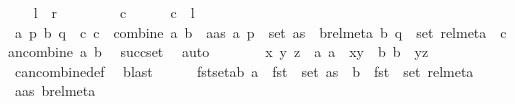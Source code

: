 \begin{isabellebody}
%
\isadelimproof
%
\endisadelimproof
%
\isatagproof
{}\isamarkupfalse%
\isanewline
\ \ \isamarkupfalse%
\ {\isachardoublequoteopen}{\isacharquery}{\kern0pt}l\ {\isasymsubseteq}\ {\isacharquery}{\kern0pt}r{\isachardoublequoteclose}\isanewline
\ \ \isamarkupfalse%
\isanewline
\ \ \ \ \isamarkupfalse%
\ c\isanewline
\ \ \ \ \isamarkupfalse%
\ {\isachardoublequoteopen}c\ {\isasymin}\ {\isacharquery}{\kern0pt}l{\isachardoublequoteclose}\isanewline
\ \ \ \ \isamarkupfalse%
\ \isamarkupfalse%
\ a\ p\ b\ q\ \ c{\isacharcolon}{\kern0pt}\ {\isachardoublequoteopen}c\ {\isacharequal}{\kern0pt}\ combine\ a\ b{\isachardoublequoteclose}\ \ a{\isacharunderscore}{\kern0pt}as{\isacharcolon}{\kern0pt}\ {\isachardoublequoteopen}{\isacharparenleft}{\kern0pt}a{\isacharcomma}{\kern0pt}\ p{\isacharparenright}{\kern0pt}\ {\isasymin}\ set\ as{\isachardoublequoteclose}\ \ b{\isacharunderscore}{\kern0pt}rel{\isacharunderscore}{\kern0pt}meta{\isacharcolon}{\kern0pt}\ {\isachardoublequoteopen}{\isacharparenleft}{\kern0pt}b{\isacharcomma}{\kern0pt}\ q{\isacharparenright}{\kern0pt}\ {\isasymin}\ set\ rel{\isacharunderscore}{\kern0pt}meta\ {\isasymand}\ can{\isacharunderscore}{\kern0pt}combine\ a\ b{\isachardoublequoteclose}\ \isamarkupfalse%
\ succ{\isacharunderscore}{\kern0pt}set\ \isamarkupfalse%
\ auto\isanewline
\ \ \ \ \isamarkupfalse%
\ \isamarkupfalse%
\ x\ y\ z\ \ a{\isacharcolon}{\kern0pt}\ {\isachardoublequoteopen}a\ {\isacharequal}{\kern0pt}\ {\isacharparenleft}{\kern0pt}x{\isacharcomma}{\kern0pt}y{\isacharparenright}{\kern0pt}{\isachardoublequoteclose}\ \ b{\isacharcolon}{\kern0pt}\ {\isachardoublequoteopen}b\ {\isacharequal}{\kern0pt}\ {\isacharparenleft}{\kern0pt}y{\isacharcomma}{\kern0pt}z{\isacharparenright}{\kern0pt}{\isachardoublequoteclose}\ \isamarkupfalse%
\ can{\isacharunderscore}{\kern0pt}combine{\isacharunderscore}{\kern0pt}def\ \isamarkupfalse%
\ blast\isanewline
\ \ \ \ \isamarkupfalse%
\ fst{\isacharunderscore}{\kern0pt}set{\isacharunderscore}{\kern0pt}ab{\isacharcolon}{\kern0pt}\ {\isachardoublequoteopen}a\ {\isasymin}\ fst\ {\isacharbackquote}{\kern0pt}\ set\ as\ {\isasymand}\ b\ {\isasymin}\ fst\ {\isacharbackquote}{\kern0pt}\ set\ rel{\isacharunderscore}{\kern0pt}meta{\isachardoublequoteclose}\ \isamarkupfalse%
\ a{\isacharunderscore}{\kern0pt}as\ b{\isacharunderscore}{\kern0pt}rel{\isacharunderscore}{\kern0pt}meta\ \isamarkupfalse%

\end{isabellebody}
